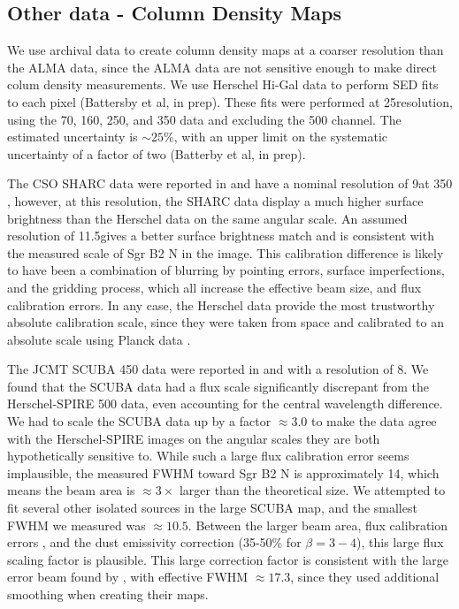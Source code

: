 \documentclass[twocolumn]{aastex61}
\newcommand{\percent}{\%\xspace}
\begin{document}
\subsection{Other data - Column Density Maps}
\label{sec:colmaps}
We use archival data to create column density maps at a coarser
resolution than the ALMA data, since the ALMA data are not sensitive
enough to make direct colum density measurements.   We use Herschel Hi-Gal
data \citep{Molinari2010a} to perform SED fits to each pixel (Battersby et al,
in prep).  These fits were performed at 25\arcsec resolution, using the 70, 160,
250, and 350 \um data and excluding the 500 \um channel.  The estimated 
uncertainty is $\sim25\%$, with an upper limit on the systematic uncertainty
of a factor of two (Batterby et al, in prep).


The CSO SHARC data were reported in \citet{Bally2010a} and have a nominal
resolution of 9\arcsec at 350 \um, however, at this resolution,
the SHARC data display a much higher surface brightness than the Herschel
data on the same angular scale.  An assumed resolution of 11.5\arcsec gives a
better surface brightness match and is consistent with the measured scale of
Sgr B2 N in the image.  This calibration difference is likely to have been a
combination of blurring by pointing errors, surface imperfections, and the
gridding process, which all increase the effective beam size, and flux
calibration errors.  In any case, the Herschel data
provide the most trustworthy absolute calibration scale, since they were taken
from space and calibrated to an absolute scale using Planck data
\citep{Bendo2013a,Bertincourt2016a}.

The JCMT SCUBA 450 \um data were reported in \citet{Pierce-Price2000a} and
\citet{di-Francesco2008a} with a resolution of 8\arcsec.  We found that the
SCUBA data had a flux scale significantly discrepant from the Herschel-SPIRE
500 \um data, even accounting for the central wavelength difference.  We had to
scale the SCUBA data up by a factor $\approx3.0$ to make the data agree with
the Herschel-SPIRE images on the angular scales they are both hypothetically
sensitive to.  While such a large flux calibration error seems implausible, the
measured FWHM toward Sgr B2 N is approximately 14\arcsec, which means the beam
area is $\approx3\times$ larger than the theoretical size.  We attempted to fit
several other isolated sources in the large SCUBA map, and the smallest FWHM we
measured was $\approx10.5$\arcsec.  Between the larger beam area, flux
calibration errors \citep[quoted at 20\percent in][]{Pierce-Price2000a}, and
the dust emissivity correction (35-50\percent for $\beta=3-4$), this large flux
scaling factor is plausible. This large correction factor is consistent with
the large error beam found by \citet{di-Francesco2008a}, with effective FWHM
$\approx17.3$\arcsec, since they used additional smoothing when creating their
maps.
\end{document}
